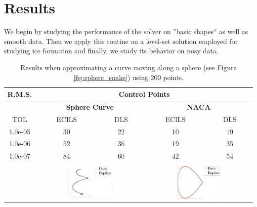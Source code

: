    
\section{Results}
We begin by studying the performance of the solver on ''basic shapes`` as well as smooth data. 
Then we apply this routine on a level-set solution employed for studying ice formation and finally, we study 
 its behavior on nosy data. 
 

 \begin{table}
 \centering
  \begin{tabular}{||c||c c || c c ||}
  \hline
 R.M.S.  &\multicolumn{4}{c||}{Control Points}\\
 \hline
  &\multicolumn{2}{c||}{\textbf{Sphere Curve}} & \multicolumn{2}{c||}{\textbf{NACA}}\\

 TOL& ECILS& DLS & ECILS & DLS\\
 \hline
1.0e-05 & 30 & 22 & 10 & 19 \\%
1.0e-06 & 52 & 36 & 19 & 35 \\%
1.0e-07 & 84 & 60 & 42 & 54 \\%

\hline
&\multicolumn{2}{c||}{}&\multicolumn{2}{c||}{}\\
&\multicolumn{2}{c||}{\includegraphics[width=0.42\textwidth]{snake-crop}}
&\multicolumn{2}{c||}{\includegraphics[width=0.42\textwidth]{naca27-crop} }\\
\hline
\end{tabular}
\caption{Results when approximating a curve moving along a sphere (see Figure \ref{fig:sphere_snake}) using 200 points.}
 \end{table}

